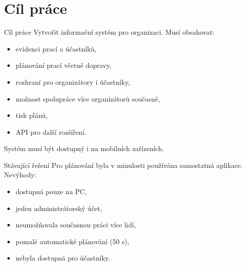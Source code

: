 \documentclass[czech,aspectratio=169]{beamer}
\begin{document}
  \section{Cíl práce}
  \begin{frame}{Cíl práce}
    Vytvořit informační systém pro organizaci. Musí obsahovat:
    \begin{itemize}
      \item evidenci prací a účastníků,
      \item plánování prací včetně dopravy,
      \item rozhraní pro organizátory i účastníky,
      \item možnost spolupráce více organizátorů současně,
      \item tisk plánů,
      \item API pro další rozšíření.
    \end{itemize}
    Systém musí být dostupný i na mobilních zařízeních.
  \end{frame}

  \begin{frame}{Stávající řešení}
    Pro plánování byla v minulosti používána samostatná aplikace.
    \linebreak
    \linebreak
    Nevýhody:
    \begin{itemize}
      \item dostupná pouze na PC,
      \item jeden administrátorský účet,
      \item neumožňovala současnou práci více lidí,
      \item pomalé automatické plánování (50 s),
      \item nebyla dostupná pro účastníky.
    \end{itemize}
  \end{frame}
\end{document}
